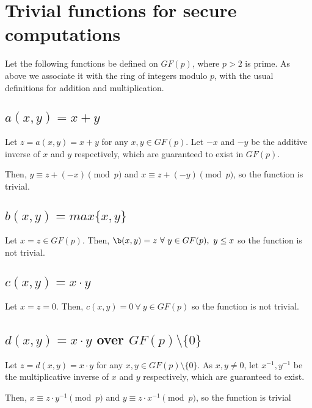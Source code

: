 \documentclass[a4paper]{scrreprt}
\begin{document}
\section{Trivial functions for secure computations}

Let the following functions be defined on $GF(p)$, where $p > 2$ is prime. As
above we associate it with the ring of integers modulo $p$, with the usual
definitions for addition and multiplication.

\subsection{\texorpdfstring{$a(x, y) = x + y$}{a(x, y) = x + y}}

Let $z = a(x, y) = x + y$ for any $x, y \in GF(p)$. Let $-x$ and $-y$ be the
additive inverse of $x$ and $y$ respectively, which are guaranteed to exist in
$GF(p)$.

Then, $y \equiv z + (-x) \pmod p$ and $x \equiv z + (-y) \pmod p$, so the
function is trivial.

\subsection{\texorpdfstring{$b(x, y) = max\{x, y\}$}{b(x, y) = max\{x, y\}}}

Let $x = z \in GF(p)$. Then, $\b(x, y) = z\ \forall\ y \in GF(p),\ y \leq x$ so
the function is not trivial.

\subsection{\texorpdfstring{$c(x, y) = x \cdot y$}{c(x, y) = x * y}}

Let $x = z = 0$. Then, $c(x, y) = 0\ \forall\ y \in GF(p)$ so the function
is not trivial.

\subsection{\texorpdfstring{$d(x, y) = x \cdot y$ over $GF(p) \setminus \{0\}$}{d(x, y) = x * y}}

Let $z = d(x, y) = x \cdot y$ for any $x, y \in GF(p) \setminus \{0\}$. As $x,
y \neq 0$, let $x^{-1}, y^{-1}$ be the multiplicative inverse of $x$ and $y$
respectively, which are guaranteed to exist.

Then, $x \equiv z \cdot y^{-1} \pmod p$ and $y \equiv z \cdot x^{-1} \pmod p$,
so the function is trivial
\end{document}
